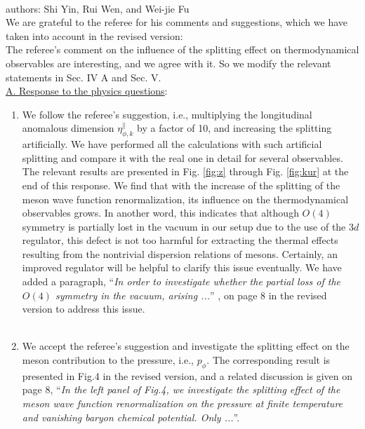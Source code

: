 \documentclass[aps,article,author-year,notitlepage,showpacs]{revtex4-1}
\begin{document}
 

\large

\\

\noindent authors: Shi Yin, Rui Wen, and Wei-jie Fu\\

\noindent We are grateful to the referee for his comments and suggestions, which we have taken into account in the revised version:\\[0.3ex] 

The referee's comment on the influence of the splitting effect on thermodynamical observables are interesting, and we agree with it. So we modify the relevant statements in Sec. IV A and Sec. V.\\[0.3ex] 

\noindent \underline{A. Response to the physics questions}:\\

\begin{enumerate}[1.]

\item We follow the referee's suggestion, i.e., multiplying the longitudinal anomalous dimension $\eta_{\phi,k}^{\parallel}$ by a factor of 10, and increasing the splitting artificially. We have performed all the calculations with such artificial splitting and compare it with the real one in detail for several observables. The relevant results are presented in Fig. \ref{fig:z} through Fig. \ref{fig:kur} at the end of this response. We find that with the increase of the splitting of the meson wave function renormalization, its influence on the thermodynamical observables grows. In another word, this indicates that although $O(4)$ symmetry is partially lost in the vacuum in our setup due to the use of the $3d$ regulator, this defect is not too harmful for extracting the thermal effects resulting from the nontrivial dispersion relations of mesons. Certainly, an improved regulator will be helpful to clarify this issue eventually. We have added a paragraph, ``{\it In order to investigate whether the partial loss of the $O(4)$ symmetry in the vacuum, arising ...}'' , on page 8 in the revised version to address this issue. \\[0.3ex] 


\item We accept the referee's suggestion and investigate the splitting effect on the meson contribution to the pressure, i.e., $p_\phi$. The corresponding result is presented in Fig.4 in the revised version, and a related discussion is given on page 8, ``{\it In the left panel of Fig.4, we investigate the splitting effect of the meson wave function renormalization on the pressure at finite temperature and vanishing baryon chemical potential. Only ...}''.\\[0.3cm] 

\end{enumerate} 
\end{document}

